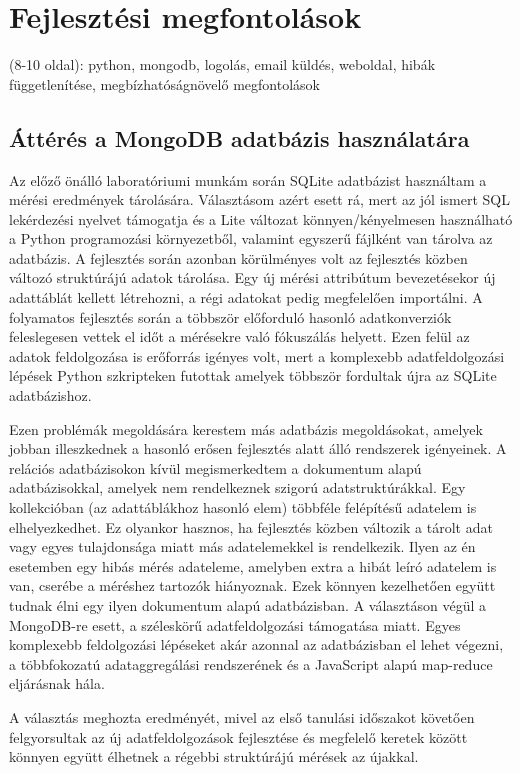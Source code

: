 
\section{Fejlesztési megfontolások}
(8-10 oldal): python, mongodb, logolás, email küldés, weboldal, hibák függetlenítése, megbízhatóságnövelő megfontolások


\subsection{Áttérés a MongoDB adatbázis használatára}
Az előző önálló laboratóriumi munkám során SQLite adatbázist használtam a mérési eredmények tárolására. Választásom azért esett rá, mert az jól ismert SQL lekérdezési nyelvet támogatja és a Lite változat könnyen/kényelmesen használható a Python programozási környezetből, valamint egyszerű fájlként van tárolva az adatbázis. A fejlesztés során azonban körülményes volt az fejlesztés közben változó struktúrájú adatok tárolása. Egy új mérési attribútum bevezetésekor új adattáblát kellett létrehozni, a régi adatokat pedig megfelelően importálni. A folyamatos fejlesztés során a többször előforduló hasonló adatkonverziók feleslegesen vettek el időt a mérésekre való fókuszálás helyett. Ezen felül az adatok feldolgozása is erőforrás igényes volt, mert a komplexebb adatfeldolgozási lépések Python szkripteken futottak amelyek többször fordultak újra az SQLite adatbázishoz.

Ezen problémák megoldására kerestem más adatbázis megoldásokat, amelyek jobban illeszkednek a hasonló erősen fejlesztés alatt álló rendszerek igényeinek. A relációs adatbázisokon kívül megismerkedtem a dokumentum alapú adatbázisokkal, amelyek nem rendelkeznek szigorú adatstruktúrákkal. Egy kollekcióban (az adattáblákhoz hasonló elem) többféle felépítésű adatelem is elhelyezkedhet. Ez olyankor hasznos, ha fejlesztés közben változik a tárolt adat vagy egyes tulajdonsága miatt más adatelemekkel is rendelkezik. Ilyen az én esetemben egy hibás mérés adateleme, amelyben extra a hibát leíró adatelem is van, cserébe a méréshez tartozók hiányoznak. Ezek könnyen kezelhetően együtt tudnak élni egy ilyen dokumentum alapú adatbázisban. A választáson végül a MongoDB-re esett, a széleskörű adatfeldolgozási támogatása miatt. Egyes komplexebb feldolgozási lépéseket akár azonnal az adatbázisban el lehet végezni, a többfokozatú adataggregálási rendszerének és a JavaScript alapú map-reduce eljárásnak hála.

A választás meghozta eredményét, mivel az első tanulási időszakot követően felgyorsultak az új adatfeldolgozások fejlesztése és megfelelő keretek között könnyen együtt élhetnek a régebbi struktúrájú mérések az újakkal.

